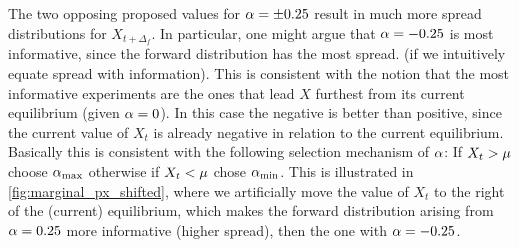 \documentclass{article}
\begin{document}
The two opposing proposed values for ${\alpha} = \pm 0.25$ result in much
more spread distributions for $X_{t+\Delta_f}$. In particular, one might argue that
${\alpha}=-0.25$ is most informative, since the forward distribution has the most
spread. (if we intuitively equate spread with information). This is consistent
with the notion that the most informative experiments are the ones that lead $X$
furthest from its current equilibrium (given ${\alpha}=0$). In this case the negative
is better than positive, since the current value of $X_t$ is already negative in
relation to the current equilibrium. Basically this is consistent with the
following selection mechanism of ${\alpha}$: If $X_t > {\mu }$ choose ${ {\alpha}_{\textrm{max}} }$ otherwise
if $X_t < {\mu }$ chose ${ {\alpha}_{\textrm{min}} }$. This is illustrated in
\cref{fig:marginal_px_shifted}, where we artificially move the value of $X_t$ to
the right of the (current) equilibrium, which makes the forward distribution
arising from ${\alpha}=0.25$ more informative (higher spread), then the one with
${\alpha}=-0.25$.
\end{document}
